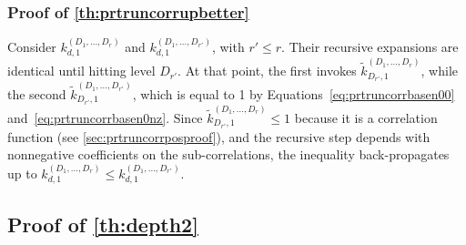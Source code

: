 \documentclass[a4paper]{article}
\theoremstyle{definition}
\begin{document}
    \subsubsection{Proof of \autoref{th:prtruncorrupbetter}}

    Consider $k^{(D_1,\ldots,D_r)}_{d,1}$ and $k^{(D_1,\ldots,D_{r'})}_{d,1}$, with $r'\le r$. Their recursive expansions are identical until hitting level $D_{r'}$. At that point, the first invokes $\tilde k^{(D_1,\ldots,D_r)}_{D_{r'},1}$, while the second $\tilde k^{(D_1,\ldots,D_{r'})}_{D_{r'},1}$, which is equal to 1 by Equations~\ref{eq:prtruncorrbasen00} and~\ref{eq:prtruncorrbasen0nz}. Since $\tilde k^{(D_1,\ldots,D_r)}_{D_{r'},1}\le 1$ because it is a correlation function (see \autoref{sec:prtruncorrposproof}), and the recursive step depends with nonnegative coefficients on the sub-correlations, the inequality back-propagates up to $k^{(D_1,\ldots,D_r)}_{d,1} \le k^{(D_1,\ldots,D_{r'})}_{d,1}$.

    \subsection{Proof of \autoref{th:depth2}}
    \label{sec:depth2}
    
\end{document}
